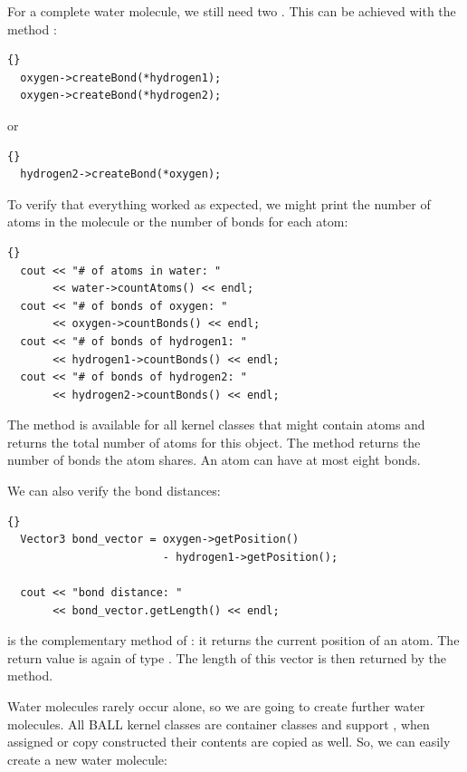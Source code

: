 \noindent
For a complete water molecule, we still need two . This can be
achieved with the method :
	
\begin{lstlisting}{}
  oxygen->createBond(*hydrogen1);
  oxygen->createBond(*hydrogen2);
\end{lstlisting}

or

\begin{lstlisting}{}
  hydrogen2->createBond(*oxygen);
\end{lstlisting}

\noindent
To verify that everything worked as expected, we might print the number of
atoms in the molecule or the number of bonds for each atom:
	
\begin{lstlisting}{}
  cout << "# of atoms in water: " 
       << water->countAtoms() << endl;
  cout << "# of bonds of oxygen: " 
       << oxygen->countBonds() << endl;
  cout << "# of bonds of hydrogen1: " 
       << hydrogen1->countBonds() << endl;
  cout << "# of bonds of hydrogen2: " 
       << hydrogen2->countBonds() << endl;
\end{lstlisting}

\noindent
The method  is available for all kernel classes that might
contain atoms and returns the total number of atoms for this object. The
method  returns the number of bonds the atom shares. An
atom can have at most eight bonds.

We can also verify the bond distances:
\begin{lstlisting}{}
  Vector3 bond_vector = oxygen->getPosition() 
                        - hydrogen1->getPosition();

  cout << "bond distance: " 
       << bond_vector.getLength() << endl;
\end{lstlisting}
	
\noindent
{} is the complementary method of : it
returns the current position of an atom. The return value is again of type
. The length of this vector is then returned by the
 method. 

Water molecules rarely occur alone, so we are going to create further water molecules.
All BALL kernel classes are container classes and support , \ie when assigned or copy constructed their contents are copied as
well. So, we can easily create a new water molecule:

